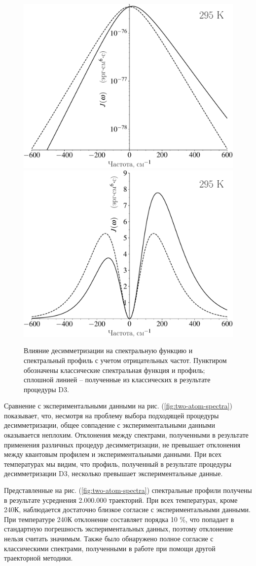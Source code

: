 \begin{figure}[H]
    \centering
    \includegraphics[width=0.49\linewidth]{./pictures/two_atom_spectra/spectral_function_d3-crop.pdf}
    \includegraphics[width=0.49\linewidth]{./pictures/two_atom_spectra/spectrum_effect_d3-crop.pdf}
    \caption{Влияние десимметризации на спектральную функцию и спектральный профиль с учетом отрицательных частот. Пунктиром обозначены классические спектральная функция и профиль; сплошной линией -- полученные из классических в результате процедуры D3.}
    \label{fig:two-atom-d3-effect}
\end{figure}

Сравнение с экспериментальными данными на рис. (\ref{fig:two-atom-spectra}) показывает, что, несмотря на проблему выбора подходящей процедуры десимметризации, общее совпадение с экспериментальными данными оказывается неплохим. Отклонения между спектрами, полученными в результате применения различных процедур десимметризации, не превышает отклонения между квантовым профилем и экспериментальными данными. При всех температурах мы видим, что профиль, полученный в результате процедуры десимметризации D3, несколько превышает экспериментальные данные. \par 
Представленные на рис. (\ref{fig:two-atom-spectra}) спектральные профили получены в результате усреднения 2.000.000 траекторий. При всех температурах, кроме 240К, наблюдается достаточно близкое согласие с экспериментальными данными. При температуре 240К отклонение составляет порядка 10 \%, что попадает в стандартную погрешность экспериментальных данных, поэтому отклонение нельзя считать значимым. Также было обнаружено полное согласие с классическими спектрами, полученными в работе \cite{buryak2014} при помощи другой траекторной методики. 

